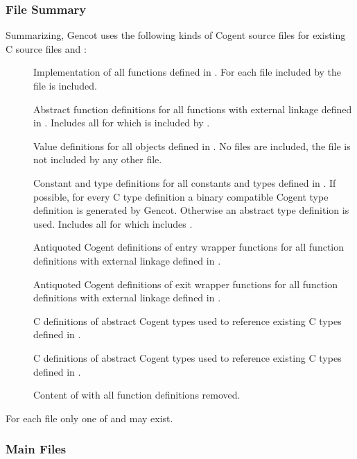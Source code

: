 \subsubsection{File Summary}

Summarizing, Gencot uses the following kinds of Cogent source files for existing C source files  and :
\begin{description}
\item[] Implementation of all functions defined in . For each file  included by
   the file  is included.
\item[] Abstract function definitions for all functions with external linkage defined in .
  Includes all  for which  is included by . 
\item[] Value definitions for all objects defined in . No files are included, the file is not
  included by any other file.
\item[] Constant and type definitions for all constants and types defined in . 
  If possible, for every C type definition a binary compatible Cogent type 
  definition is generated by Gencot. Otherwise an abstract type definition is used. Includes
  all  for which  includes .
\item[] Antiquoted Cogent definitions of entry wrapper functions for all function definitions with external linkage
  defined in .
\item[] Antiquoted Cogent definitions of exit wrapper functions for all function definitions with external linkage
  defined in .
\item[] C definitions of abstract Cogent types used to reference existing C types defined in .
\item[] C definitions of abstract Cogent types used to reference existing C types defined in .
\item[] Content of  with all function definitions removed.
\end{description}
For each file  only one of  and  may exist.

\subsubsection{Main Files}

